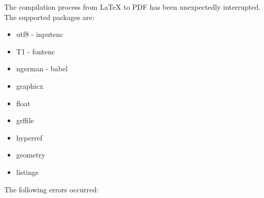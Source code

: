 The compilation process from \LaTeX{} to PDF has been unexpectedly interrupted.
The supported packages are:

\begin{itemize}
    \item utf8 - inputenc
    \item T1 - fontenc
    \item ngerman - babel
    \item graphicx
    \item float
    \item grffile
    \item hyperref
    \item geometry
    \item listings
\end{itemize}

The following errors occurred:

